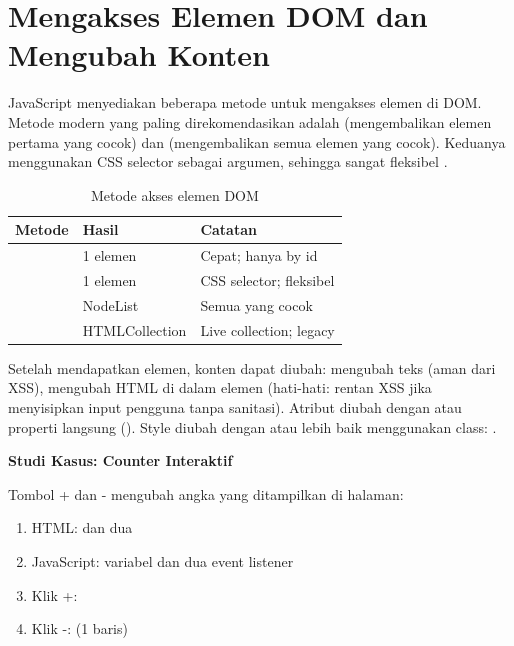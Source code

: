 \section{Mengakses Elemen DOM dan Mengubah Konten}

JavaScript menyediakan beberapa metode untuk mengakses elemen di DOM. Metode modern yang paling direkomendasikan adalah  (mengembalikan elemen pertama yang cocok) dan  (mengembalikan semua elemen yang cocok). Keduanya menggunakan CSS selector sebagai argumen, sehingga sangat fleksibel \cite{mdnJsGuide}.

\begin{table}[htbp]
\centering
\begin{tabular}{|P{5cm}|P{2.5cm}|P{4.5cm}|}
\hline
\textbf{Metode} & \textbf{Hasil} & \textbf{Catatan} \\
\hline
{} & 1 elemen & Cepat; hanya by id \\
\hline
{} & 1 elemen & CSS selector; fleksibel \\
\hline
{} & NodeList & Semua yang cocok \\
\hline
{} & HTMLCollection & Live collection; legacy \\
\hline
\end{tabular}
\caption{Metode akses elemen DOM}
\end{table}

Setelah mendapatkan elemen, konten dapat diubah:  mengubah teks (aman dari XSS),  mengubah HTML di dalam elemen (hati-hati: rentan XSS jika menyisipkan input pengguna tanpa sanitasi). Atribut diubah dengan  atau properti langsung (). Style diubah dengan  atau lebih baik menggunakan class:  \cite{jsInfo}.

\begin{contoh}
\textbf{Studi Kasus: Counter Interaktif}

Tombol + dan - mengubah angka yang ditampilkan di halaman:
\begin{enumerate}
  \item HTML:  dan dua 
  \item JavaScript: variabel  dan dua event listener
  \item Klik +: 
  \item Klik -:  (1 baris)
\end{enumerate}
\end{contoh}

